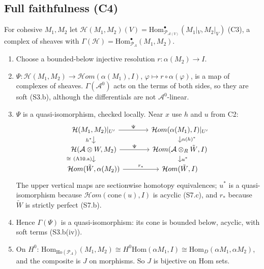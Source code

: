 \documentclass[11pt,a4paper]{article}
\newcommand{\cA}{\mathcal{A}}
\newcommand{\Ho}{\mathrm{Ho}}
\newcommand{\Hom}{\mathrm{Hom}}
\begin{document}
\subsection{Full faithfulness (C4)}
For cohesive $M_1,M_2$ let $\mathcal H(M_1,M_2)(V)=\Hom^\bullet_{\mathcal P_{\cA(V)}}(M_1|_V,M_2|_V)$ (C3),
a complex of sheaves with $\Gamma(\mathcal H)=\Hom^\bullet_{\mathcal P_A}(M_1,M_2)$.
\begin{enumerate}
\item Choose a bounded-below injective resolution $r\colon\alpha(M_2)\to I$.
\item $\Psi\colon\mathcal H(M_1,M_2)\to\mathcal Hom(\alpha(M_1),I)$, $\varphi\mapsto r\circ\alpha(\varphi)$, is a map of
complexes of sheaves. $\Gamma(\cA^0)$ acts on the terms of both sides, so they are soft (S3.b),
although the differentials are not $\cA^0$-linear.
\item $\Psi$ is a quasi-isomorphism, checked locally. Near $x$ use $h$ and $u$ from C2:
\[\begin{tikzcd}[column sep=large,row sep=small]
\mathcal H(M_1,M_2)|_{U'} \arrow[r,"\Psi"] \arrow[d,"h^*"'] & \mathcal Hom(\alpha(M_1),I)|_{U'} \arrow[d,"\alpha(h)^*"]\\
\mathcal H(\cA\otimes W,M_2) \arrow[r,"\Psi"] \arrow[d,"\cong\ (\text{A10.a})"'] & \mathcal Hom(\cA\otimes_R\tilde W,I) \arrow[d,"u^*"]\\
\mathcal Hom(\tilde W,\alpha(M_2)) \arrow[r,"r_*"] & \mathcal Hom(\tilde W,I)
\end{tikzcd}\]
The upper vertical maps are sectionwise homotopy equivalences; $u^*$ is a quasi-isomorphism
because $\mathcal Hom(\mathrm{cone}(u),I)$ is acyclic (S7.c), and $r_*$ because $\tilde W$ is strictly perfect
(S7.b).
\item Hence $\Gamma(\Psi)$ is a quasi-isomorphism: its cone is bounded below, acyclic, with soft terms
(S3.b(iv)).
\item On $H^0$:
$\Hom_{\Ho(\mathcal P_A)}(M_1,M_2)\cong H^0\Hom(\alpha M_1,I)\cong\Hom_{D}(\alpha M_1,\alpha M_2)$,
and the composite is $J$ on morphisms. So $J$ is bijective on Hom sets.
\end{enumerate}
\end{document}
